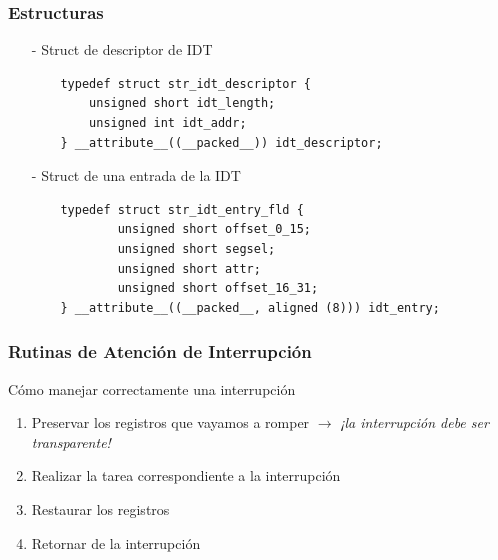 \documentclass[aspectratio=169]{beamer}
\begin{document}
\begin{frame}[fragile]
    \frametitle{Estructuras}
    \begin{itemize}
    \item[-] \textcolor{verdeuca}{Struct de descriptor de IDT}
    \begin{verbatim}
    typedef struct str_idt_descriptor {
        unsigned short idt_length;
        unsigned int idt_addr;
    } __attribute__((__packed__)) idt_descriptor;
    \end{verbatim}
    \vspace{0.3cm}
    \item[-] \textcolor{verdeuca}{Struct de una entrada de la IDT}
    \begin{verbatim}
    typedef struct str_idt_entry_fld {
            unsigned short offset_0_15;
            unsigned short segsel;
            unsigned short attr;
            unsigned short offset_16_31;
    } __attribute__((__packed__, aligned (8))) idt_entry;
    \end{verbatim}
    \end{itemize}
\end{frame}

\begin{frame}
\frametitle{Rutinas de Atención de Interrupción}
    \begin{block}{Cómo manejar correctamente una interrupción}
    \begin{enumerate}
    \setlength\itemsep{0.7cm}
        \item Preservar los registros que vayamos a romper \pause $\rightarrow$ \alert{\emph{¡la interrupción debe ser transparente!}}
        \pause
        \item Realizar la tarea correspondiente a la interrupción
        \pause
        \item Restaurar los registros
        \pause
        \item Retornar de la interrupción
    \end{enumerate}
    \end{block}
\end{frame}
\end{document}
